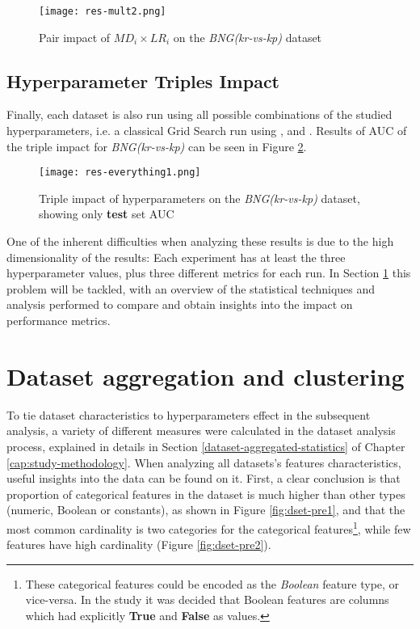 \begin{figure}[!h]
    \centering
    \texttt{[image: res-mult2.png]}
    \caption{Pair impact of $MD_i \times LR_i$  on the \textit{BNG(kr-vs-kp)} dataset}
    \label{fig:res-mult2}
\end{figure}

\subsection{Hyperparameter Triples Impact}
\label{subsec:triple-impact}

Finally, each dataset is also run using all possible combinations of the studied hyperparameters, i.e. a classical Grid Search run using ,  and . Results of AUC of the triple impact for  \textit{BNG(kr-vs-kp)} can be seen in Figure \ref{fig:res-all1}.

\begin{figure}[!h]
    \centering
    \texttt{[image: res-everything1.png]} 
    \caption{Triple impact of hyperparameters on the \textit{BNG(kr-vs-kp)} dataset, showing only \textbf{test} set AUC}
    \label{fig:res-all1}
\end{figure}

One of the inherent difficulties when analyzing these results is due to the high dimensionality of the results: Each experiment has at least the three hyperparameter values, plus three different metrics for each run. In Section \ref{} this problem will be tackled, with an overview of the statistical techniques and analysis performed to compare and obtain insights into the impact on performance metrics.

\section{Dataset aggregation and clustering}

To tie dataset characteristics to hyperparameters effect in the subsequent analysis, a variety of different measures were calculated in the dataset analysis process, explained in details in Section \ref{dataset-aggregated-statistics} of Chapter \ref{cap:study-methodology}. When analyzing all datasets's features characteristics, useful insights into the data can be found on it. First, a clear conclusion is that proportion of categorical features in the dataset is much higher than  other types (numeric, Boolean or constants), as shown in Figure \ref{fig:dset-pre1}, and that the most common cardinality is two categories for the categorical features\footnote{These categorical features could be encoded as the \textit{Boolean} feature type, or vice-versa. In the study it was decided that Boolean features are columns which had explicitly \textbf{True} and \textbf{False} as values.}, while few features have high cardinality (Figure \ref{fig:dset-pre2}).

